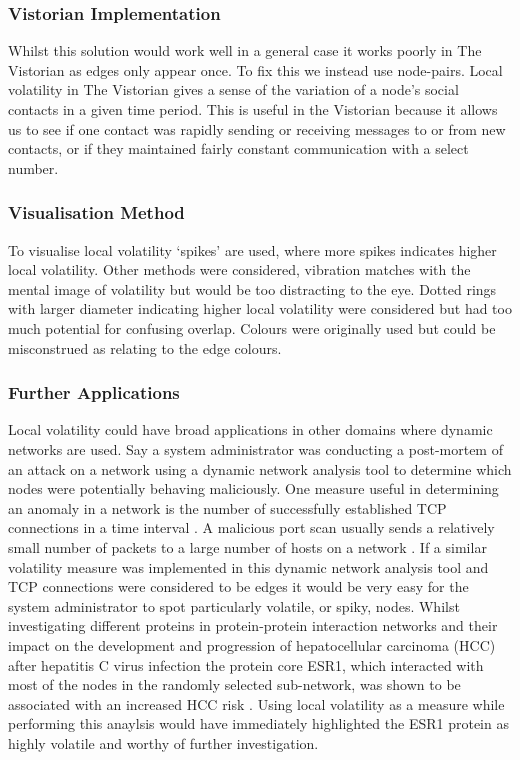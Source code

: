\subsubsection{Vistorian Implementation}
Whilst this solution would work well in a general case it works poorly in The Vistorian as edges only appear once. To fix this we instead use node-pairs. 
Local volatility in The Vistorian gives a sense of the variation of a node's social contacts in a given time period. This is useful in the Vistorian because it allows us to see if one contact was rapidly sending or receiving messages to or from new contacts, or if they maintained fairly constant communication with a select number. 

\subsubsection{Visualisation Method}
To visualise local volatility ‘spikes’ are used, where more spikes indicates higher local volatility. Other methods were considered, vibration matches with the mental image of volatility but would be too distracting to the eye. Dotted rings with larger diameter indicating higher local volatility were considered but had too much potential for confusing overlap. Colours were originally used but could be misconstrued as relating to the edge colours. 


\subsubsection{Further Applications}
Local volatility could have broad applications in other domains where dynamic networks are used. 
\newline\newline
Say a system administrator was conducting a post-mortem of an attack on a network using a dynamic network analysis tool to determine which nodes were potentially behaving maliciously. One measure useful in determining an anomaly in a network is the number of successfully established TCP connections in a time interval \cite{fnpfid}. A malicious port scan usually sends a relatively small number of packets to a large number of hosts on a network \cite{fnpfid}. If a similar volatility measure was implemented in this dynamic network analysis tool and TCP connections were considered to be edges it would be very easy for the system administrator to spot particularly volatile, or spiky, nodes.
\newline\newline
Whilst investigating different proteins in protein-protein interaction networks and their impact on the development and progression of hepatocellular carcinoma (HCC) after hepatitis C virus infection the protein core ESR1, which interacted with most of the nodes in the randomly selected sub-network, was shown to be associated with an increased HCC risk \cite{acaotdbnihih}. Using local volatility as a measure while performing this anaylsis would have immediately highlighted the ESR1 protein as highly volatile and worthy of further investigation.

